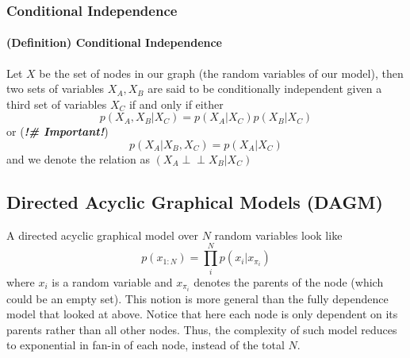 \documentclass[11pt]{article}
\newcommand{\independent}{\perp \!\!\! \perp}
\begin{document}
\subsubsection{Conditional Independence} 
\paragraph{(Definition) Conditional Independence} Let $X$ be the set of nodes in our graph (the random variables of our model), then two sets of variables $X_A, X_B$ are said to be conditionally independent given a third set of variables $X_C$ if and only if either
\begin{equation*}
    p\left(X_{A}, X_{B} | X_{C}\right)=p\left(X_{A} | X_{C}\right) p\left(X_{B} | X_{C}\right)
\end{equation*}
or (\textit{\textbf{!\# Important!}})
\begin{equation*}
    p\left(X_{A} | X_{B}, X_{C}\right)=p\left(X_{A} | X_{C}\right)
\end{equation*}
and we denote the relation as $\left(X_{A} \independent X_{B} | X_{C}\right)$

\subsection{Directed Acyclic Graphical Models (DAGM)}
A directed acyclic graphical model over $N$ random variables look like
\begin{equation*}
    p\left(x_{1:N}\right)=\prod_{i}^{N} p\left(x_{i} | x_{\pi_{i}}\right)
\end{equation*}
where $x_i$ is a random variable and $x_{\pi_i}$ denotes the parents of the node (which could be an empty set). This notion is more general than the fully dependence model that looked at above. Notice that here each node is only dependent on its parents rather than all other nodes. Thus, the complexity of such model reduces to exponential in fan-in of each node, instead of the total $N$. 
\end{document}
